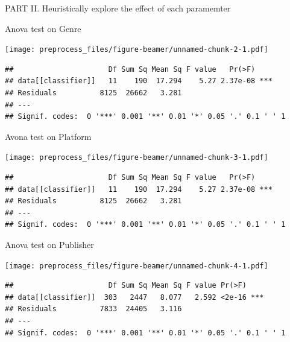 \documentclass[ignorenonframetext,]{beamer}
\begin{document}
\begin{frame}[fragile]{PART II. Heuristically explore the effect of each
paramemter}
\protect\hypertarget{part-ii.-heuristically-explore-the-effect-of-each-paramemter}{}

\begin{block}{Anova test on Genre}

\texttt{[image: preprocess\_files/figure-beamer/unnamed-chunk-2-1.pdf]}

\begin{verbatim}
##                      Df Sum Sq Mean Sq F value   Pr(>F)    
## data[[classifier]]   11    190  17.294    5.27 2.37e-08 ***
## Residuals          8125  26662   3.281                     
## ---
## Signif. codes:  0 '***' 0.001 '**' 0.01 '*' 0.05 '.' 0.1 ' ' 1
\end{verbatim}

\end{block}

\begin{block}{Avona test on Platform}

\texttt{[image: preprocess\_files/figure-beamer/unnamed-chunk-3-1.pdf]}

\begin{verbatim}
##                      Df Sum Sq Mean Sq F value   Pr(>F)    
## data[[classifier]]   11    190  17.294    5.27 2.37e-08 ***
## Residuals          8125  26662   3.281                     
## ---
## Signif. codes:  0 '***' 0.001 '**' 0.01 '*' 0.05 '.' 0.1 ' ' 1
\end{verbatim}

\end{block}

\begin{block}{Anova test on Publisher}

\texttt{[image: preprocess\_files/figure-beamer/unnamed-chunk-4-1.pdf]}

\begin{verbatim}
##                      Df Sum Sq Mean Sq F value Pr(>F)    
## data[[classifier]]  303   2447   8.077   2.592 <2e-16 ***
## Residuals          7833  24405   3.116                   
## ---
## Signif. codes:  0 '***' 0.001 '**' 0.01 '*' 0.05 '.' 0.1 ' ' 1
\end{verbatim}

\end{block}

\end{frame}
\end{document}
